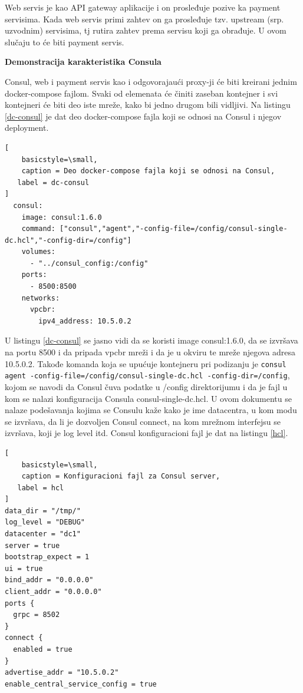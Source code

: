 \documentclass[a4paper,12pt]{report}
\begin{document}
Web servis je kao API gateway aplikacije i on prosleđuje pozive ka payment servisima.  Kada web servis primi zahtev on ga prosleđuje tzv. upstream (srp. uzvodnim) servisima, tj rutira zahtev prema servisu koji ga obrađuje. U ovom slučaju to će biti payment servis. \newline

\textbf{Demonstracija karakteristika Consula}\newline

Consul, web i payment servis kao i odgovorajaući proxy-ji će biti kreirani jednim docker-compose fajlom. Svaki od elemenata će činiti zaseban kontejner i svi kontejneri će biti deo iste mreže, kako bi jedno drugom bili vidljivi. Na listingu \ref{dc-consul} je dat deo docker-compose fajla koji se odnosi na Consul i njegov deployment. \newline

\begin{lstlisting}[
    basicstyle=\small,
    caption = Deo docker-compose fajla koji se odnosi na Consul, 
   label = dc-consul
]
  consul:
    image: consul:1.6.0
    command: ["consul","agent","-config-file=/config/consul-single-dc.hcl","-config-dir=/config"]
    volumes:
      - "../consul_config:/config"
    ports:
      - 8500:8500
    networks:
      vpcbr:
        ipv4_address: 10.5.0.2
\end{lstlisting}

U listingu \ref{dc-consul} se jasno vidi da se koristi image consul:1.6.0, da se izvršava na portu 8500 i da pripada vpcbr mreži i da je u okviru te mreže njegova adresa 10.5.0.2. Takođe komanda koja se upućuje kontejneru pri podizanju je \texttt{consul agent -config-file=/config/consul-single-dc.hcl -config-dir=/config}, kojom se navodi da Consul čuva podatke u /config direktorijumu i da je fajl u kom se nalazi konfiguracija Consula consul-single-dc.hcl. U ovom dokumentu se nalaze podešavanja kojima se Consulu kaže kako je ime datacentra, u kom modu se izvršava, da li je dozvoljen Consul connect, na kom mrežnom interfejsu se izvršava, koji je log level itd. Consul konfiguracioni fajl je dat na listingu \ref{hcl}. \newline

\begin{lstlisting}[
    basicstyle=\small,
    caption = Konfiguracioni fajl za Consul server, 
   label = hcl
]
data_dir = "/tmp/"
log_level = "DEBUG"
datacenter = "dc1"
server = true
bootstrap_expect = 1
ui = true
bind_addr = "0.0.0.0"
client_addr = "0.0.0.0"
ports {
  grpc = 8502
}
connect {
  enabled = true
}
advertise_addr = "10.5.0.2"
enable_central_service_config = true
\end{lstlisting}
\end{document}
